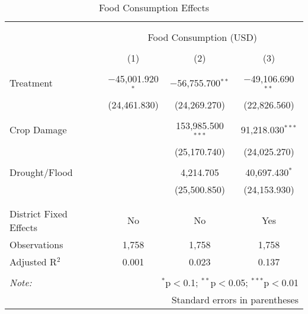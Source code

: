 

\begin{table}[!htbp] \centering 
  \caption{Food Consumption Effects} 
  \label{} 
\begin{tabular}{@{\extracolsep{5pt}}lccc} 
\\[-1.8ex]\hline 
\hline \\[-1.8ex] 
\\[-1.8ex] & \multicolumn{3}{c}{Food Consumption (USD)} \\ 
\\[-1.8ex] & (1) & (2) & (3)\\ 
\hline \\[-1.8ex] 
 Treatment & $-$45,001.920$^{*}$ & $-$56,755.700$^{**}$ & $-$49,106.690$^{**}$ \\ 
  & (24,461.830) & (24,269.270) & (22,826.560) \\ 
  & & & \\ 
 Crop Damage &  & 153,985.500$^{***}$ & 91,218.030$^{***}$ \\ 
  &  & (25,170.740) & (24,025.270) \\ 
  & & & \\ 
 Drought/Flood &  & 4,214.705 & 40,697.430$^{*}$ \\ 
  &  & (25,500.850) & (24,153.930) \\ 
  & & & \\ 
\hline \\[-1.8ex] 
District Fixed Effects & No & No & Yes \\ 
Observations & 1,758 & 1,758 & 1,758 \\ 
Adjusted R$^{2}$ & 0.001 & 0.023 & 0.137 \\ 
\hline 
\hline \\[-1.8ex] 
\textit{Note:}  & \multicolumn{3}{r}{$^{*}$p$<$0.1; $^{**}$p$<$0.05; $^{***}$p$<$0.01} \\ 
 & \multicolumn{3}{r}{Standard errors in parentheses} \\ 
\end{tabular} 
\end{table} 
